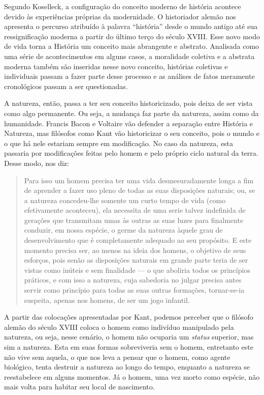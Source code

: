 \begin{refsection}
    Segundo Koselleck, a configuração do conceito moderno de história acontece devido às experiências próprias da modernidade. O historiador alemão nos apresenta o percurso atribuído à palavra “história” desde o mundo antigo até sua ressignificação moderna a partir do último terço do século XVIII. Esse novo modo de vida torna a História um conceito mais abrangente e abstrato. Analisada como uma série de acontecimentos em alguns casos, a moralidade coletiva e a abstrata moderna também são inseridas nesse novo conceito, histórias coletivas e individuais passam a fazer parte desse processo e as análises de fatos meramente cronológicos passam a ser questionadas. 

    A natureza, então, passa a ter seu conceito historicizado, pois deixa de ser vista como algo permanente. Ou seja, a mudança faz parte da natureza, assim como da humanidade.  Francis Bacon e Voltaire vão defender a separação entre História e Natureza, mas filósofos como Kant vão historicizar o seu conceito, pois o mundo e o que há nele estariam sempre em modificação. No caso da natureza, esta passaria por modificações feitas pelo homem e pelo próprio ciclo natural da terra. Desse modo, \textcite[p.~6]{KANT2004Ideia} nos diz: 

    \begin{quotation}
        Para isso um homem precisa ter uma vida desmesuradamente longa a fim de aprender a fazer uso pleno de todas as suas disposições naturais; ou, se a natureza concedeu-lhe somente um curto tempo de vida (como efetivamente aconteceu), ela necessita de uma serie talvez indefinida de gerações que transmitam umas às outras as suas luzes para finalmente conduzir, em nossa espécie, o germe da natureza àquele grau de desenvolvimento que é completamente adequado ao seu propósito. E este momento precisa ser, ao menos na ideia dos homens, o objetivo de seus esforços, pois senão as disposições naturais em grande parte teria de ser vistas como inúteis e sem finalidade --- o que aboliria todos os princípios práticos, e com isso a natureza, cuja sabedoria no julgar precisa antes servir como princípio para todas as suas outras formações, tornar-se-ia suspeita, apenas nos homens, de ser um jogo infantil. 
    \end{quotation}

    A partir das colocações apresentadas por Kant, podemos perceber que o filósofo alemão do século XVIII coloca o homem como indivíduo manipulado pela natureza, ou seja, nesse cenário, o homem não ocuparia um \textit{status} superior, mas sim a natureza. Esta em suas formas sobreviveria sem o homem, entretanto este não vive sem aquela, o que nos leva a pensar que o homem, como agente biológico, tenta destruir a natureza ao longo do tempo, enquanto a natureza se reestabelece em alguns momentos. Já o homem, uma vez morto como espécie, não mais volta para habitar seu local de nascimento. 


\end{refsection}
